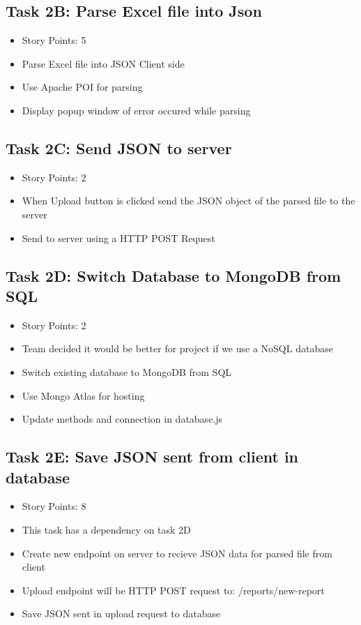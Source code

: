 \documentclass[12pt]{article}
\begin{document}
\subsection{Task 2B: Parse Excel file into Json}
\begin{itemize}%
\item Story Points: 5
\item Parse Excel file into JSON Client side 
\item Use Apache POI for parsing
\item Display popup window of error occured while parsing 
\end{itemize}

\subsection{Task 2C: Send JSON to server}
\begin{itemize}%
\item Story Points: 2
\item When Upload button is clicked send the JSON object of the parsed file to the server
\item Send to server using a HTTP POST Request
\end{itemize}

\subsection{Task 2D: Switch Database to MongoDB from SQL}
\begin{itemize}%
\item Story Points: 2
\item Team decided it would be better for project if we use a NoSQL database
\item Switch existing database to MongoDB from SQL
\item Use Mongo Atlas for hosting
\item Update methods and connection in database.js
\end{itemize}

\subsection{Task 2E: Save JSON sent from client in database}
\begin{itemize}%
\item Story Points: 8
\item This task has a dependency on task 2D
\item Create new endpoint on server to recieve JSON data for parsed file from client
\item Upload endpoint will be HTTP POST request to: /reports/new-report
\item Save JSON sent in upload request to database
\end{itemize}
\end{document}

